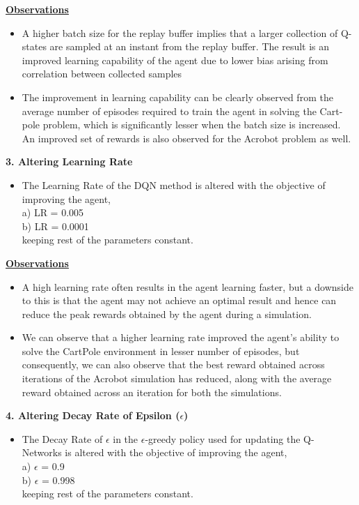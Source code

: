 \documentclass{article}
\begin{document}
\begin{itemize}
        \textbf{\underline{Observations}}
        \begin{itemize}
            \item A higher batch size for the replay buffer implies that a larger collection
            of Q-states are sampled at an instant from the replay buffer. The result
            is an improved learning capability of the agent due to lower bias arising
            from correlation between collected samples
            \item The improvement in learning capability can be clearly observed from the
            average number of episodes required to train the agent in solving the Cart-
            pole problem, which is significantly lesser when the batch size is increased. An improved set of rewards is also observed for the Acrobot problem as
            well.
        \end{itemize}


        \textbf{ 3. Altering Learning Rate} \\
        \begin{itemize}
            \item The Learning Rate of the DQN method is altered with the objective of
            improving the agent,\\
            a) LR = 0.005 \\
            b) LR = 0.0001\\
            keeping rest of the parameters constant. \\
        \end{itemize}

        \textbf{\underline{Observations}}
        \begin{itemize}
            \item A high learning rate often results in the agent learning faster, but a downside to this is that the agent may not achieve an optimal result and hence can reduce the peak rewards obtained by the agent during a simulation.
            \item We can observe that a higher learning rate improved the agent’s ability to solve the CartPole environment in lesser number of episodes, but consequently, we can also observe that the best reward obtained across iterations of the Acrobot simulation has reduced, along with the average
            reward obtained across an iteration for both the simulations.
        \end{itemize}
        \newpage
        \textbf{ 4. Altering Decay Rate of Epsilon ($\epsilon$)}\\
        \begin{itemize}
            \item The Decay Rate of $\epsilon$ in the $\epsilon$-greedy policy used for updating the Q-
            Networks is altered with the objective of improving the agent, \\
            a) $\epsilon$ = 0.9 \\
            b) $\epsilon$ = 0.998 \\
            keeping rest of the parameters constant. \\
        \end{itemize}


\end{itemize}
\end{document}
